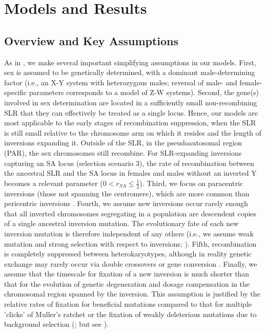 \documentclass{article}[12pt]
\begin{document}
\section*{Models and Results} \label{sec:Models}


\subsection*{Overview and Key Assumptions} \label{sec:assumptions}
As in \citet{Olito-etal-2022}, we make several important simplifying assumptions in our models. First, sex is assumed to be genetically determined, with a dominant male-determining factor (i.e., an X-Y system with heterozygous males; reversal of male- and female-specific parameters corresponds to a model of Z-W systems). Second, the gene(s) involved in sex determination are located in a sufficiently small non-recombining SLR that they can effectively be treated as a single locus. Hence, our models are most applicable to the early stages of recombination suppression, when the SLR is still small relative to the chromosome arm on which it resides and the length of inversions expanding it. Outside of the SLR, in the pseudoautosomal region (PAR), the sex chromosomes still recombine. For SLR-expanding inversions capturing an SA locus (selection scenario $3$), the rate of recombination between the ancestral SLR and the SA locus in females and males without an inverted Y becomes a relevant parameter ($0 < r_{SA} \leq \frac{1}{2}$). %
Third, we focus on paracentric inversions (those not spanning the centromere), which are more common than pericentric inversions \citep{WellenreutherBernatchez2018}. Fourth, we assume new inversions occur rarely enough that all inverted chromosomes segregating in a population are descendent copies of a single ancestral inversion mutation. The evolutionary fate of each new inversion mutation is therefore independent of any others (i.e., we assume weak mutation and strong selection with respect to inversions; \citealt{Gillespie1991}). Fifth, recombination is completely suppressed between heterokaryotypes, although in reality genetic exchange may rarely occur via double crossovers or gene conversion \citep{KrimbasPowell1992, KorunesNoor2019}. Finally, we assume that the timescale for fixation of a new inversion is much shorter than that for the evolution of genetic degeneration and dosage compensation in the chromosomal region spanned by the inversion. This assumption is justified by the relative rates of fixation for beneficial mutations compared to that for multiple 'clicks' of Muller's ratchet or the fixation of weakly deleterious mutations due to background selection (\citealt{Charlesworth2000, Bachtrog2008}; but see \citealt{LenormandRoze2020, LenormandRoze2022}).
\end{document}

